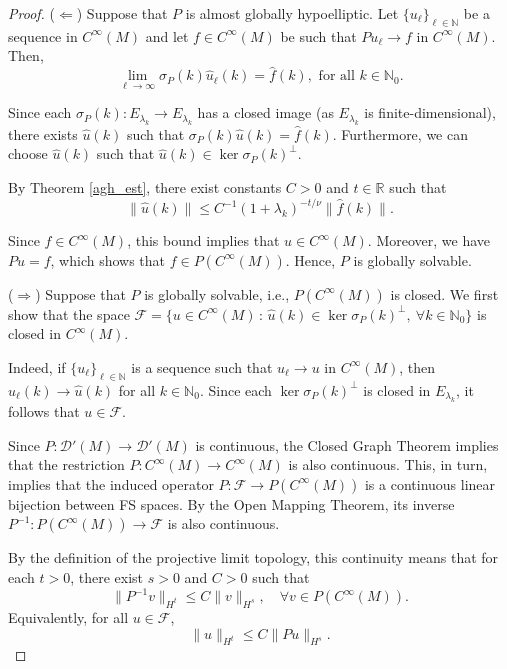 \documentclass[10pt,a4paper]{amsart}
\begin{document}
	\begin{proof}
		\noindent($\Leftarrow$) Suppose that $P$ is almost globally hypoelliptic.
		Let $\{u_\ell\}_{\ell\in\mathbb{N}}$ be a sequence in $C^\infty(M)$ and let $f\in C^\infty(M)$ be such that $Pu_\ell\to f$ in $C^\infty(M)$. Then,
		\begin{equation*}
			\lim\limits_{\ell\to\infty}\sigma_P(k)\widehat{u}_\ell(k) = \widehat{f}(k), \text{ for all } k\in\mathbb{N}_0.
		\end{equation*}
		
		Since each $\sigma_P(k):E_{\lambda_k}\to E_{\lambda_k}$ has a closed image (as $E_{\lambda_k}$ is finite-dimensional), there exists $\widehat{u}(k)$ such that $\sigma_P(k)\widehat{u}(k)=\widehat{f}(k)$. Furthermore, we can choose $\widehat{u}(k)$ such that $\widehat{u}(k) \in \ker\sigma_P(k)^\perp$.  
		
		By Theorem \ref{agh_est}, there exist constants $C>0$ and $t\in\mathbb{R}$ such that
		\begin{equation*}
			\|\widehat{u}(k)\|\leq C^{-1}(1+\lambda_k)^{-t/\nu}\|\widehat{f}(k)\|.
		\end{equation*}

		Since $f\in C^\infty(M)$, this bound implies that $u\in C^\infty(M)$. Moreover, we have $Pu=f$, which shows that $f\in P(C^\infty(M))$. Hence, $P$ is globally solvable.  
		
		\medskip\noindent
		($\Rightarrow$) Suppose that $P$ is globally solvable, i.e., $P(C^\infty(M))$ is closed.
		We first show that the space $\mathcal{F}=\{u\in C^\infty(M)\,:\, \widehat{u}(k)\in\ker\sigma_P(k)^\perp,\ \forall k\in\mathbb{N}_0\}$	is closed in $C^\infty(M)$. 
		
		Indeed, if $\{u_\ell\}_{\ell\in\mathbb{N}}$ is a sequence such that $u_\ell\to u$ in $C^\infty(M)$, then $\widehat{u}_\ell(k)\to\widehat{u}(k)$ for all $k\in\mathbb{N}_0$. Since each $\ker\sigma_P(k)^\perp$ is closed in $E_{\lambda_k}$, it follows that $u\in\mathcal{F}$.  
		
		Since $P:\mathscr{D}'(M)\to\mathscr{D}'(M)$ is continuous, the Closed Graph Theorem implies that the restriction $P:C^\infty(M)\to C^\infty(M)$ is also continuous. This, in turn, implies that the induced operator $P:\mathcal{F}\to P(C^\infty(M))$ is a continuous linear bijection between FS spaces. By the Open Mapping Theorem, its inverse  $P^{-1}: P(C^\infty(M))\to\mathcal{F}$ is also continuous.  
		
		By the definition of the projective limit topology, this continuity means that for each $t>0$, there exist $s>0$ and $C>0$ such that
		\begin{equation*}
			\|P^{-1}v\|_{H^t}\leq C\|v\|_{H^s},\quad \forall v\in P(C^\infty(M)).
		\end{equation*}
		Equivalently, for all $u\in\mathcal{F}$,
		\begin{equation*}
			\|u\|_{H^t}\leq C\|Pu\|_{H^s}.
		\end{equation*}
		

\end{proof}
\end{document}
